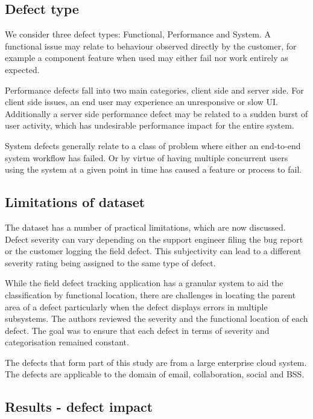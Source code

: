 \subsection{Defect type}

We consider three defect types: Functional, Performance and System. A functional issue may relate to behaviour observed directly by the customer, for example a component feature when used may either fail nor work entirely as expected. 

Performance defects fall into two main categories, client side and server side. For client side issues, an end user may experience an unresponsive or slow UI. Additionally a server side performance defect may be related to a sudden burst of user activity, which has undesirable performance impact for the entire system.

System defects generally relate to a class of problem where either an end-to-end system workflow has failed. Or by virtue of having multiple concurrent users using the system at a given point in time has caused a feature or process to fail.

\subsection{Limitations of dataset}

The dataset has a number of practical limitations, which are now discussed. Defect severity can vary depending on the support engineer filing the bug report or the customer logging the field defect. This subjectivity can lead to a different severity rating being assigned to the same type of defect. \par

While the field defect tracking application has a granular system to aid the classification by functional location, there are challenges in locating the parent area of a defect particularly when the defect displays errors in multiple subsystems.
The authors reviewed the severity and the functional location of each defect. The goal was to ensure that each defect in terms of severity and categorisation remained constant. \par

The defects that form part of this study are from a large enterprise cloud system. The defects are applicable to the domain of email, collaboration, social and BSS.

\subsection{Results - defect impact}


